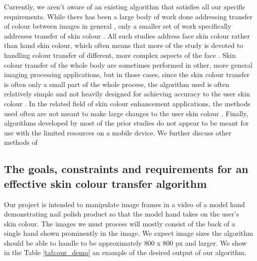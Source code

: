 Currently, we aren't aware of an existing algorithm that satisfies all our specific requirements. While there has been a large body of work done addressing transfer of colour between images in general \cite{reinhard_2001_transfer, pitie_2005_pdf, chen_2014_propagation, chang_2015_palette, zhang_2017_decomposition}, only a smaller set of work specifically addresses transfer of skin colour \cite{yin_2004_transfer, seo_2005_transfer, yang_2017_semantic}. All such studies address face skin colour rather than hand skin colour, which often means that more of the study is devoted to handling colour transfer of different, more complex aspects of the face \cite{yang_2017_semantic}. Skin colour transfer of the whole body are sometimes performed in other, more general imaging processing applications, but in those cases, since the skin colour transfer is often only a small part of the whole process, the algorithm used is often relatively simple and not heavily designed for achieving accuracy to the user skin colour \cite{shilkrot_2013_garment, li_2015_replace}. In the related field of skin colour enhancement applications, the methods used often are not meant to make large changes to the user skin colour \cite{aradhye_2009_enhancement, lee_2010_mobile}. Finally, algorithms developed by most of the prior studies do not appear to be meant for use with the limited resources on a mobile device. We further discuss other methods of 



\subsection{The goals, constraints and requirements for an effective skin colour transfer algorithm}
Our project is intended to manipulate image frames in a video of a model hand demonstrating nail polish product so that the model hand takes on the user's skin colour. The images we must process will mostly consist of the back of a single hand shown prominently in the image. We expect image sizes the algorithm should be able to handle to be approximately 800 x 800 px and larger. We show in the Table \ref{tab:our_demo} an example of the desired output of our algorithm. 


